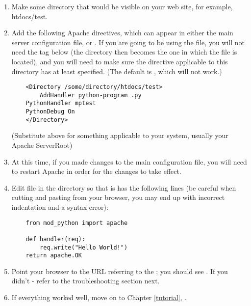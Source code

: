 \begin{enumerate}

\item
  Make some directory that would be visible on your web site, for
  example, htdocs/test.

\item
  Add the following Apache directives, which can appear in either the
  main server configuration file, or .  If you are
  going to be using the  file, you will not need the
   tag below (the directory then becomes the one in
  which the  file is located), and you will need to
  make sure the  directive applicable to this
  directory has at least  specified. (The default is
  , which will not work.)  

  \begin{verbatim}
    <Directory /some/directory/htdocs/test> 
        AddHandler python-program .py
	PythonHandler mptest 
	PythonDebug On 
    </Directory>
  \end{verbatim}

  (Substitute  above for something applicable to
  your system, usually your Apache ServerRoot)

\item
  At this time, if you made changes to the main configuration file, you
  will need to restart Apache in order for the changes to take effect.

\item
  Edit  file in the  directory so
  that is has the following lines (be careful when cutting and pasting
  from your browser, you may end up with incorrect indentation and a
  syntax error):

  \begin{verbatim}
    from mod_python import apache

    def handler(req):
        req.write("Hello World!")
	return apache.OK 
  \end{verbatim}

\item
  Point your browser to the URL referring to the ;
  you should see . If you didn't - refer to the
  troubleshooting section next.

\item
  If everything worked well, move on to Chapter \ref{tutorial}, 
  . 

\end{enumerate}

